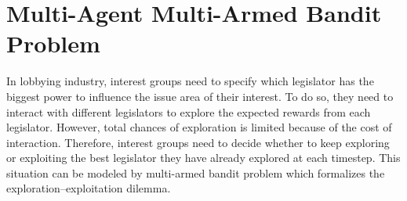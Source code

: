 \documentclass{article}
\begin{document}









\section{Multi-Agent Multi-Armed Bandit Problem}

In lobbying industry, interest groups 
need to specify which legislator
has the biggest power to influence the issue area of their interest.
To do so, 
they need to interact with different legislators 
to explore the expected rewards from each legislator.
However, total chances of exploration is limited 
because of the cost of interaction.
Therefore, interest groups 
need to decide 
whether to 
keep exploring or 
exploiting the best legislator they have already explored at each timestep.
This situation can be modeled by multi-armed bandit problem
which formalizes the exploration–exploitation dilemma.
\end{document}
